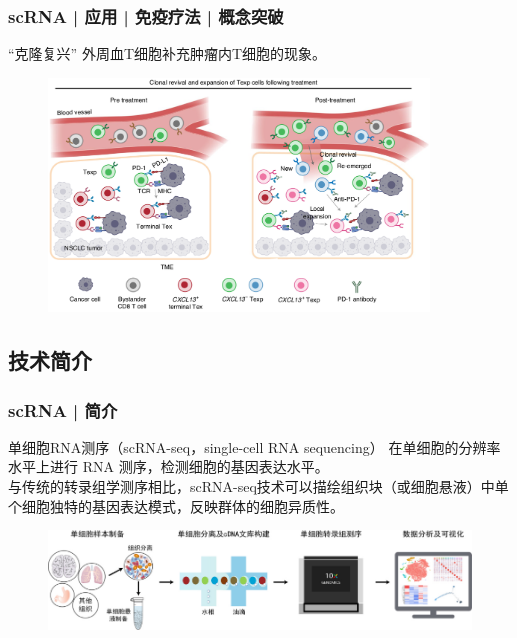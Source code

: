 \documentclass[11pt]{ctexbeamer}
\begin{document}
\begin{frame}
  \frametitle{scRNA | 应用 | 免疫疗法 | 概念突破}
  \begin{block}{“克隆复兴”}
  外周血T细胞补充肿瘤内T细胞的现象。
  \end{block}
   \begin{figure}
    \centering
    \includegraphics[width=0.9\textwidth]{PD1_NC_03.png}
  \end{figure}
\end{frame}

\subsection{技术简介}
\begin{frame}
  \frametitle{scRNA | 简介}
  \begin{block}{单细胞RNA测序（scRNA-seq，single-cell RNA sequencing）}
  在\alert{单细胞的分辨率水平}上进行 RNA 测序，检测细胞的基因表达水平。\\
  与传统的转录组学测序相比，scRNA-seq技术可以描绘组织块（或细胞悬液）中单个细胞独特的基因表达模式，反映群体的\alert{细胞异质性}。
  \end{block}
     \begin{figure}
    \centering
    \includegraphics[width=\textwidth]{scRNA_intro_01.png}
  \end{figure}
\end{frame}
\end{document}
